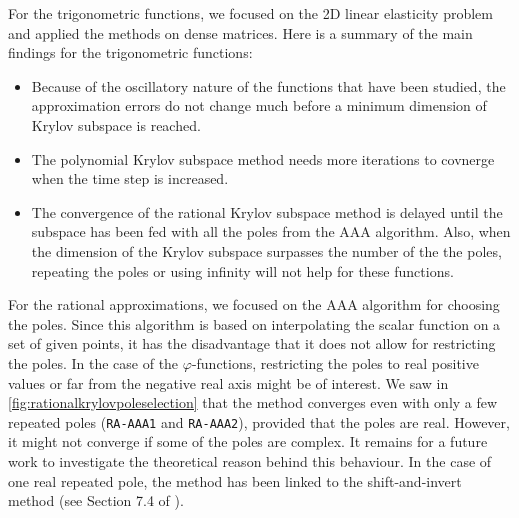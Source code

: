 For the trigonometric functions, we focused on the 2D linear elasticity problem and
applied the methods on dense matrices.
Here is a summary of the main findings for the trigonometric functions:
\begin{itemize}
    \item Because of the oscillatory nature of the functions that have been studied,
        the approximation errors do not change much before a minimum dimension of
        Krylov subspace is reached.
    \item The polynomial Krylov subspace method needs more iterations to covnerge
        when the time step is increased.
    \item The convergence of the rational Krylov subspace method is delayed until
        the subspace has been fed with all the poles from the AAA algorithm.
        Also, when the dimension of the Krylov subspace surpasses the number of the
        the poles, repeating the poles or using infinity will not help for these functions.
\end{itemize}

For the rational approximations, we focused on the AAA algorithm for choosing the poles.
Since this algorithm is based on interpolating the scalar function on a set of given
points, it has the disadvantage that it does not allow for restricting the poles.
In the case of the $\varphi$-functions, restricting the poles to real positive values
or far from the negative real axis might be of interest.
We saw in \autoref{fig:rationalkrylovpoleselection} that the method converges even with
only a few repeated poles (\texttt{RA-AAA1} and \texttt{RA-AAA2}), provided that the poles
are real. However, it might not converge if some of the poles are complex.
It remains for a future work to investigate the theoretical reason behind this behaviour.
In the case of one real repeated pole, the method has been linked to the shift-and-invert
method (see Section 7.4 of \cite{guttel2010rational}).
